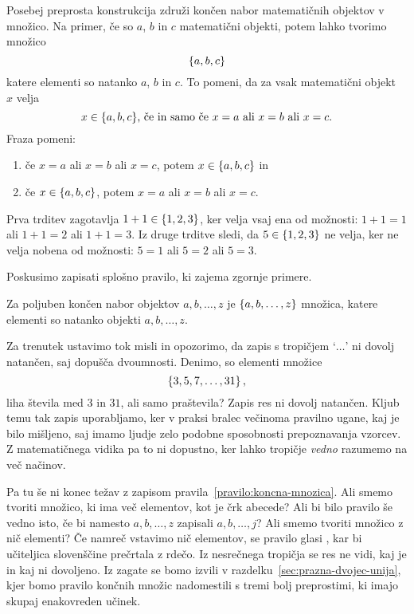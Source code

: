Posebej preprosta konstrukcija združi končen nabor matematičnih objektov v množico.
Na primer, če so $a$, $b$ in $c$ matematični objekti, potem lahko tvorimo množico
%
\begin{equation*}
  \left\{a, b, c\right\}
\end{equation*}
%
katere elementi so natanko $a$, $b$ in $c$. To pomeni, da za vsak matematični objekt~$x$
velja
%
\begin{equation*}
  \text{$x \in \left\{a, b, c\right\}$, če in samo če $x = a$ ali $x = b$ ali $x = c$.}
\end{equation*}
%
Fraza  pomeni:
%
\begin{enumerate}
\item če $x = a$ ali $x = b$ ali $x = c$, potem $x \in \left\{a, b, c\right\}$ in
\item če $x \in \left\{a, b, c\right\}$, potem $x = a$ ali $x = b$ ali $x = c$.
\end{enumerate}
%
Prva trditev zagotavlja $1+1 \in \left\{1, 2, 3\right\}$, ker velja
vsaj ena od možnosti: $1 + 1 = 1$ ali $1 + 1 = 2$ ali $1 + 1 = 3$. Iz druge trditve sledi, da
$5 \in \left\{1, 2, 3\right\}$ ne velja, ker ne velja nobena od možnosti: $5 = 1$ ali $5 = 2$ ali
$5 = 3$.

Poskusimo zapisati splošno pravilo, ki zajema zgornje primere.

\begin{pravilo}
  \label{pravilo:koncna-mnozica}
  Za poljuben končen nabor objektov $a, b, \ldots, z$ je $\left\{a, b, \ldots, z\right\}$ množica, katere elementi
  so natanko objekti $a, b, \ldots, z$.
\end{pravilo}

Za trenutek ustavimo tok misli in opozorimo, da zapis s tropičjem `$\ldots$' ni dovolj
natančen, saj dopušča dvoumnosti. Denimo, so elementi množice
%
\begin{equation*}
  \left\{3, 5, 7, \ldots, 31\right\},
\end{equation*}
%
liha števila med $3$ in $31$, ali samo praštevila? Zapis res ni dovolj natančen. Kljub
temu tak zapis uporabljamo, ker v praksi bralec večinoma pravilno ugane, kaj je
bilo mišljeno, saj imamo ljudje zelo podobne sposobnosti prepoznavanja vzorcev. Z
matematičnega vidika pa to ni dopustno, ker lahko tropičje \emph{vedno} razumemo na več
načinov.

Pa tu še ni konec težav z zapisom pravila~\ref{pravilo:koncna-mnozica}. Ali smemo
tvoriti množico, ki ima več elementov, kot je črk abecede? Ali bi bilo pravilo še vedno
isto, če bi namesto $a, b, \ldots, z$ zapisali $a, b, \ldots, j$? Ali smemo
tvoriti množico z nič elementi? Če namreč vstavimo nič elementov, se pravilo glasi , kar bi učiteljica
slovenščine prečrtala z rdečo. Iz nesrečnega tropičja se res ne vidi, kaj je in kaj ni dovoljeno. 
%
Iz zagate se bomo izvili v razdelku~\ref{sec:prazna-dvojec-unija}, kjer bomo pravilo končnih množic nadomestili s tremi
bolj preprostimi, ki imajo skupaj enakovreden učinek.

